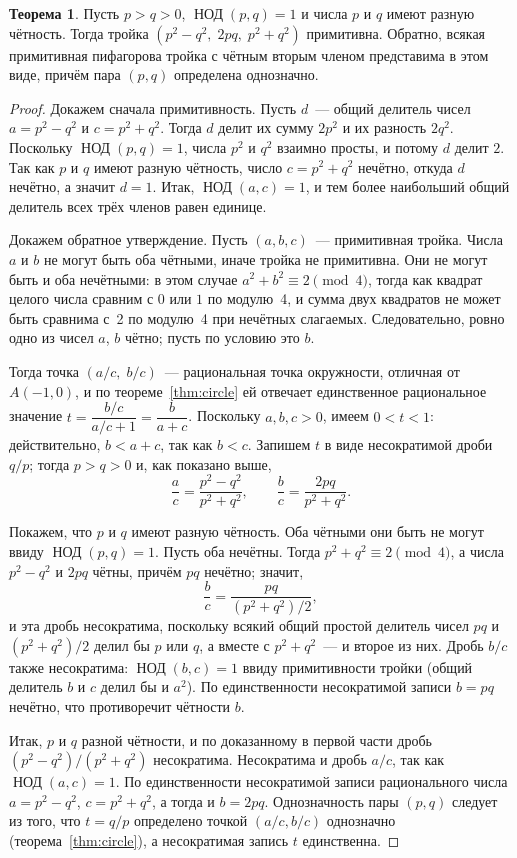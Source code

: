 \documentclass[a4paper,14pt]{extreport}
\theoremstyle{definition}
\newtheorem{thm}{Теорема}[chapter]
\providecommand{\gcdru}{}\renewcommand{\gcdru}{\mathop{\text{НОД}}\nolimits}
\begin{document}
\begin{thm}\label{thm:triples}
Пусть $p>q>0$, $\gcdru(p,q)=1$ и числа $p$ и $q$ имеют разную
чётность. Тогда тройка $(p^2-q^2,\;2pq,\;p^2+q^2)$ примитивна. Обратно, всякая
примитивная пифагорова тройка с чётным вторым членом представима в этом виде,
причём пара $(p,q)$ определена однозначно.
\end{thm}

\begin{proof}
Докажем сначала примитивность. Пусть $d$~--- общий делитель чисел
$a=p^2-q^2$ и $c=p^2+q^2$. Тогда $d$ делит их сумму $2p^2$ и их разность
$2q^2$. Поскольку $\gcdru(p,q)=1$, числа $p^2$ и $q^2$ взаимно
просты, и потому $d$ делит $2$. Так как $p$ и $q$ имеют разную чётность, число
$c=p^2+q^2$ нечётно, откуда $d$ нечётно, а значит $d=1$. Итак,
$\gcdru(a,c)=1$, и тем более наибольший общий делитель всех трёх
членов равен единице.

Докажем обратное утверждение. Пусть $(a,b,c)$~--- примитивная тройка. Числа $a$
и $b$ не могут быть оба чётными, иначе тройка не примитивна. Они не могут быть
и оба нечётными: в этом случае $a^2+b^2\equiv 2\pmod 4$, тогда как квадрат
целого числа сравним с $0$ или $1$ по модулю~4, и сумма двух квадратов не может
быть сравнима с~2 по модулю~4 при нечётных слагаемых. Следовательно, ровно одно
из чисел $a$, $b$ чётно; пусть по условию это $b$.

Тогда точка $(a/c,\;b/c)$~--- рациональная точка окружности, отличная от
$A(-1,0)$, и по теореме~\ref{thm:circle} ей отвечает единственное рациональное
значение $t=\dfrac{b/c}{a/c+1}=\dfrac{b}{a+c}$. Поскольку $a,b,c>0$, имеем
$0<t<1$: действительно, $b<a+c$, так как $b<c$. Запишем $t$ в виде несократимой
дроби $q/p$; тогда $p>q>0$ и, как показано выше,
\[
  \frac{a}{c}=\frac{p^2-q^2}{p^2+q^2},\qquad \frac{b}{c}=\frac{2pq}{p^2+q^2}.
\]

Покажем, что $p$ и $q$ имеют разную чётность. Оба чётными они быть не могут
ввиду $\gcdru(p,q)=1$. Пусть оба нечётны. Тогда $p^2+q^2\equiv2\pmod4$, а числа
$p^2-q^2$ и $2pq$ чётны, причём $pq$ нечётно; значит,
\[
  \frac{b}{c}=\frac{pq}{(p^2+q^2)/2},
\]
и эта дробь несократима, поскольку всякий общий простой делитель чисел $pq$ и
$(p^2+q^2)/2$ делил бы $p$ или $q$, а вместе с $p^2+q^2$~--- и второе из них. Дробь
$b/c$ также несократима: $\gcdru(b,c)=1$ ввиду примитивности тройки (общий
делитель $b$ и $c$ делил бы и $a^2$). По единственности несократимой записи
$b=pq$ нечётно, что противоречит чётности $b$.

Итак, $p$ и $q$ разной чётности, и по доказанному в первой части дробь
$(p^2-q^2)/(p^2+q^2)$ несократима. Несократима и дробь $a/c$, так как
$\gcdru(a,c)=1$. По единственности несократимой записи рационального числа
$a=p^2-q^2$, $c=p^2+q^2$, а тогда и $b=2pq$. Однозначность пары $(p,q)$ следует
из того, что $t=q/p$ определено точкой $(a/c,b/c)$ однозначно
(теорема~\ref{thm:circle}), а несократимая запись $t$ единственна.
\end{proof}
\end{document}

